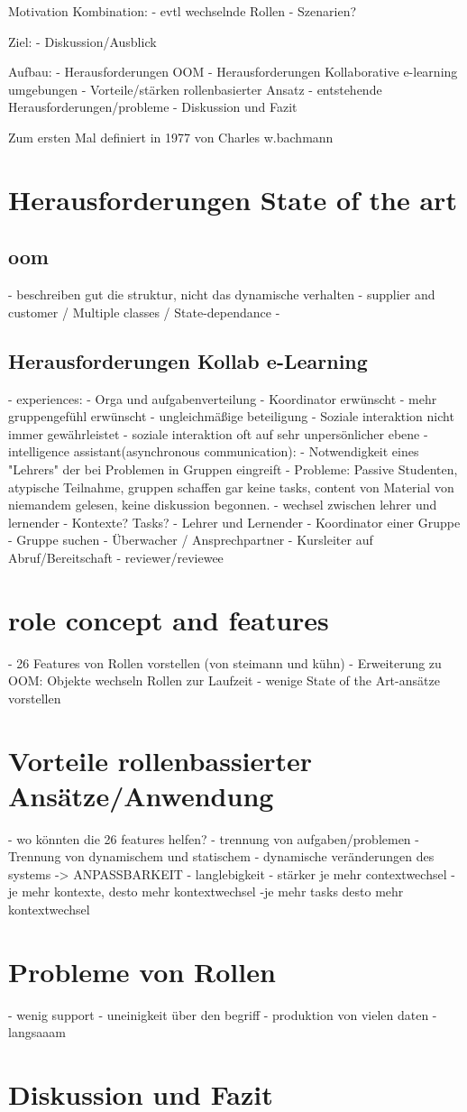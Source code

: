 \documentclass[conference]{IEEEtran}
\begin{document}
Motivation Kombination:
- evtl wechselnde Rollen 
- Szenarien? 

Ziel:
- Diskussion/Ausblick

Aufbau:
- Herausforderungen OOM
- Herausforderungen Kollaborative e-learning umgebungen
- Vorteile/stärken rollenbasierter Ansatz
- entstehende Herausforderungen/probleme
- Diskussion und Fazit

Zum ersten Mal definiert in 1977 von Charles w.bachmann


\section{Herausforderungen State of the art}
\subsection{oom}
- beschreiben gut die struktur, nicht das dynamische verhalten
- supplier and customer / Multiple classes / State-dependance
- 
\subsection{Herausforderungen Kollab e-Learning}
- experiences: 
	- Orga und aufgabenverteilung
	- Koordinator erwünscht
	- mehr gruppengefühl erwünscht
	- ungleichmäßige beteiligung
- Soziale interaktion nicht immer gewährleistet
	- soziale interaktion oft auf sehr unpersönlicher ebene
- intelligence assistant(asynchronous communication):
	- Notwendigkeit eines "Lehrers" der bei Problemen in Gruppen eingreift
		- Probleme: Passive Studenten, atypische Teilnahme, gruppen schaffen gar keine tasks, content von Material von niemandem gelesen, keine diskussion begonnen.
- wechsel zwischen lehrer und lernender
- Kontexte? Tasks?  
	- Lehrer und Lernender
	- Koordinator einer Gruppe
	- Gruppe suchen
	- Überwacher / Ansprechpartner
	- Kursleiter auf Abruf/Bereitschaft
	- reviewer/reviewee


\section{role concept and features}
- 26 Features von Rollen vorstellen (von steimann und kühn)
- Erweiterung zu OOM: Objekte wechseln Rollen zur Laufzeit
- wenige State of the Art-ansätze vorstellen


\section{Vorteile rollenbassierter Ansätze/Anwendung}
- wo könnten die 26 features helfen? 
- trennung von aufgaben/problemen
- Trennung von dynamischem und statischem
- dynamische veränderungen des systems -> ANPASSBARKEIT
- langlebigkeit
- stärker je mehr contextwechsel
	-je mehr kontexte, desto mehr kontextwechsel
		-je mehr tasks desto mehr kontextwechsel
\section{Probleme von Rollen}
- wenig support
- uneinigkeit über den begriff 
- produktion von vielen daten
- langsaaam \cite{bachman}


\section{Diskussion und Fazit}

{}

\end{document}
